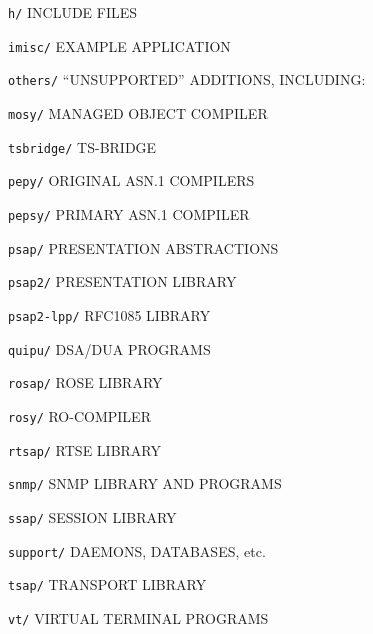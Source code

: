 \begin{bwslide}

\begin{nrtc}
\item	\verb"h/" INCLUDE FILES

\item	\verb"imisc/" EXAMPLE APPLICATION

\item	\verb"others/" ``UNSUPPORTED'' ADDITIONS, INCLUDING:
    \begin{nrtc}
    \item	\verb"mosy/" MANAGED OBJECT COMPILER

    \item	\verb"tsbridge/" TS-BRIDGE
    \end{nrtc}

\item	\verb"pepy/" ORIGINAL ASN.1 COMPILERS

\item	\verb"pepsy/" PRIMARY ASN.1 COMPILER

\item	\verb"psap/" PRESENTATION ABSTRACTIONS

\item	\verb"psap2/" PRESENTATION LIBRARY

\item	\verb"psap2-lpp/" RFC1085 LIBRARY
\end{nrtc}
\end{bwslide}


\begin{bwslide}

\begin{nrtc}
\item	\verb"quipu/" DSA/DUA PROGRAMS

\item	\verb"rosap/" ROSE LIBRARY

\item	\verb"rosy/" RO-COMPILER

\item	\verb"rtsap/" RTSE LIBRARY

\item	\verb"snmp/" SNMP LIBRARY AND PROGRAMS

\item	\verb"ssap/" SESSION LIBRARY

\item	\verb"support/" DAEMONS, DATABASES, etc.

\item	\verb"tsap/" TRANSPORT LIBRARY

\item	\verb"vt/" VIRTUAL TERMINAL PROGRAMS
\end{nrtc}
\end{bwslide}



